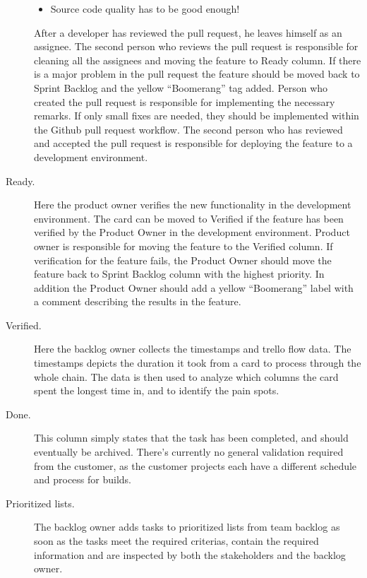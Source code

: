 \documentclass[english]{tktltiki2}
\theoremstyle{definition}
\theoremstyle{remark}
\begin{document}
\begin{description}
\begin{itemize}
	\item  Source code quality has to be good enough!
\end{itemize}
After a developer has reviewed the pull request, he leaves himself as an assignee. The second person who reviews the pull request is responsible for cleaning all the assignees and moving the feature to Ready column. If there is a major problem in the pull request the feature should be moved back to Sprint Backlog and the yellow “Boomerang” tag added. Person who created the pull request is responsible for implementing the necessary remarks.
If only small fixes are needed, they should be implemented within the Github pull request workflow.
The second person who has reviewed and accepted the pull request is responsible for deploying the feature to a development environment.
\item[Ready.] Here the product owner verifies the new functionality in the development environment. The card can be moved to Verified if the feature has been verified by the Product Owner in the development environment. Product owner is responsible for moving the feature to the Verified column.
If verification for the feature fails, the Product Owner should move the feature back to Sprint Backlog column with the highest priority. In addition the Product Owner should add a yellow “Boomerang” label with a comment describing the results in the feature.
\item[Verified.] Here the backlog owner collects the timestamps and trello flow data. The timestamps depicts the duration it took from a card to process through the whole chain. The data is then used to analyze which columns the card spent the longest time in, and to identify the pain spots.
\item[Done.] This column simply states that the task has been completed, and should eventually be archived. There’s currently no general validation required from the customer, as the customer projects each have a different schedule and process for builds.
\item[Prioritized lists.] The backlog owner adds tasks to prioritized lists from team backlog as soon as the tasks meet the required criterias, contain the required information and are inspected by both the stakeholders and the backlog owner.
\end{description}
\end{document}
